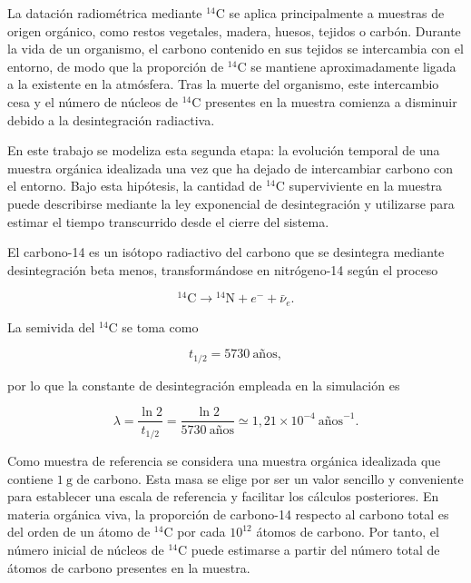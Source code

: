 \documentclass[12pt,a4paper]{article}
\begin{document}
La datación radiométrica mediante $^{14}\text{C}$ se aplica principalmente a muestras de origen orgánico, como restos vegetales, madera, huesos, tejidos o carbón. Durante la vida de un organismo, el carbono contenido en sus tejidos se intercambia con el entorno, de modo que la proporción de $^{14}\text{C}$ se mantiene aproximadamente ligada a la existente en la atmósfera. Tras la muerte del organismo, este intercambio cesa y el número de núcleos de $^{14}\text{C}$ presentes en la muestra comienza a disminuir debido a la desintegración radiactiva.

En este trabajo se modeliza esta segunda etapa: la evolución temporal de una muestra orgánica idealizada una vez que ha dejado de intercambiar carbono con el entorno. Bajo esta hipótesis, la cantidad de $^{14}\text{C}$ superviviente en la muestra puede describirse mediante la ley exponencial de desintegración y utilizarse para estimar el tiempo transcurrido desde el cierre del sistema.

El carbono-14 es un isótopo radiactivo del carbono que se desintegra mediante desintegración beta menos, transformándose en nitrógeno-14 según el proceso

\begin{equation}
{}^{14}\text{C} \longrightarrow {}^{14}\text{N} + e^- + \bar{\nu}_e .
\end{equation}

La semivida del $^{14}\text{C}$ se toma como

\begin{equation}
t_{1/2}=5730~\text{años},
\end{equation}

por lo que la constante de desintegración empleada en la simulación es

\begin{equation}
\lambda = \frac{\ln 2}{t_{1/2}}
= \frac{\ln 2}{5730~\text{años}}
\simeq 1{,}21 \times 10^{-4}~\text{años}^{-1}.
\end{equation}

Como muestra de referencia se considera una muestra orgánica idealizada que contiene $1\ \text{g}$ de carbono. Esta masa se elige por ser un valor sencillo y conveniente para establecer una escala de referencia y facilitar los cálculos posteriores. En materia orgánica viva, la proporción de carbono-14 respecto al carbono total es del orden de un átomo de $^{14}\text{C}$ por cada $10^{12}$ átomos de carbono. Por tanto, el número inicial de núcleos de $^{14}\text{C}$ puede estimarse a partir del número total de átomos de carbono presentes en la muestra.
\end{document}
